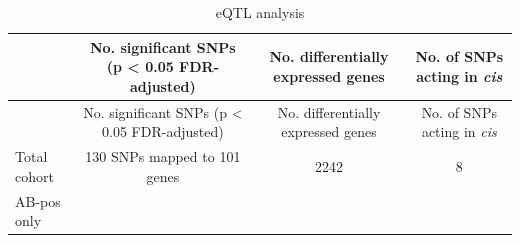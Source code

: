 \documentclass[]{article}
\begin{document}
\begin{longtable}[]{@{}lccc@{}}
\caption{eQTL analysis}\tabularnewline
\toprule
\begin{minipage}[b]{0.15\columnwidth}\raggedright\strut
\strut
\end{minipage} & \begin{minipage}[b]{0.19\columnwidth}\centering\strut
No. significant SNPs (p \textless{} 0.05 FDR-adjusted)\strut
\end{minipage} & \begin{minipage}[b]{0.30\columnwidth}\centering\strut
No. differentially expressed genes\strut
\end{minipage} & \begin{minipage}[b]{0.25\columnwidth}\centering\strut
No. of SNPs acting in \emph{cis}\strut
\end{minipage}\tabularnewline
\midrule
\endfirsthead
\toprule
\begin{minipage}[b]{0.15\columnwidth}\raggedright\strut
\strut
\end{minipage} & \begin{minipage}[b]{0.19\columnwidth}\centering\strut
No. significant SNPs (p \textless{} 0.05 FDR-adjusted)\strut
\end{minipage} & \begin{minipage}[b]{0.30\columnwidth}\centering\strut
No. differentially expressed genes\strut
\end{minipage} & \begin{minipage}[b]{0.25\columnwidth}\centering\strut
No. of SNPs acting in \emph{cis}\strut
\end{minipage}\tabularnewline
\midrule
\endhead
\begin{minipage}[t]{0.15\columnwidth}\raggedright\strut
Total cohort\strut
\end{minipage} & \begin{minipage}[t]{0.19\columnwidth}\centering\strut
130 SNPs mapped to 101 genes\strut
\end{minipage} & \begin{minipage}[t]{0.30\columnwidth}\centering\strut
2242\strut
\end{minipage} & \begin{minipage}[t]{0.25\columnwidth}\centering\strut
8\strut
\end{minipage}\tabularnewline
\begin{minipage}[t]{0.15\columnwidth}\raggedright\strut
AB-pos only\strut
\end{minipage} & \begin{minipage}[t]{0.19\columnwidth}\centering\strut

\end{minipage}
\end{longtable}
\end{document}
